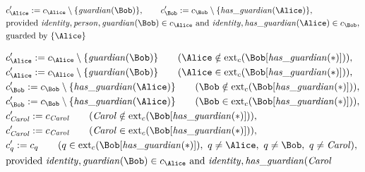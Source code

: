 \begin{align*}
&
c'_
{
\Alice
}
 := 
c_
{
\Alice
}
 \setminus 
\{
\mathit{\detokenize{
guardian
}}
(
\Bob
)
\}
, \qquad 
c'_
{
\Bob
}
 := 
c_
{
\Bob
}
 \setminus 
\{
\mathit{\detokenize{
has_guardian
}}
(
\Alice
)
\}
,\\
&
\text{provided } 
\mathit{\detokenize{
identity
}}
,
\mathit{\detokenize{
person
}}
,
\mathit{\detokenize{
guardian
}}
(
\Bob
)
 \in c_
{
\Alice
}
 \text{ and } 
\mathit{\detokenize{
identity
}}
,
\mathit{\detokenize{
has_guardian
}}
(
\Alice
)
 \in c_
{
\Bob
}
,\\
&
\text{guarded by } \{
\Alice
\}
\end{align*}

\begin{align*}
&
c'_
{
\Alice
}
 := 
c_
{
\Alice
}
 \setminus 
\{
\mathit{\detokenize{
guardian
}}
(
\Bob
)
\}
 \qquad (
\Alice
 \notin 
\mathrm{ext}_c(
\Bob
[
\mathit{\detokenize{
has_guardian
}}
(
\ast
)
]
)
)
,\\
&
c'_
{
\Alice
}
 := 
c_
{
\Alice
}
 \setminus 
\{
\mathit{\detokenize{
guardian
}}
(
\Bob
)
\}
 \qquad (
\Alice
 \in 
\mathrm{ext}_c(
\Bob
[
\mathit{\detokenize{
has_guardian
}}
(
\ast
)
]
)
)
,\\
&
c'_
{
\Bob
}
 := 
c_
{
\Bob
}
 \setminus 
\{
\mathit{\detokenize{
has_guardian
}}
(
\Alice
)
\}
 \qquad (
\Bob
 \notin 
\mathrm{ext}_c(
\Bob
[
\mathit{\detokenize{
has_guardian
}}
(
\ast
)
]
)
)
,\\
&
c'_
{
\Bob
}
 := 
c_
{
\Bob
}
 \setminus 
\{
\mathit{\detokenize{
has_guardian
}}
(
\Alice
)
\}
 \qquad (
\Bob
 \in 
\mathrm{ext}_c(
\Bob
[
\mathit{\detokenize{
has_guardian
}}
(
\ast
)
]
)
)
,\\
&
c'_
{
\mathit{Carol}
}
 := 
c_
{
\mathit{Carol}
}
 \qquad (
\mathit{Carol}
 \notin 
\mathrm{ext}_c(
\Bob
[
\mathit{\detokenize{
has_guardian
}}
(
\ast
)
]
)
)
,\\
&
c'_
{
\mathit{Carol}
}
 := 
c_
{
\mathit{Carol}
}
 \qquad (
\mathit{Carol}
 \in 
\mathrm{ext}_c(
\Bob
[
\mathit{\detokenize{
has_guardian
}}
(
\ast
)
]
)
)
,\\
&
c'_
q
 := 
c_
q
 \qquad (
q
 \in 
\mathrm{ext}_c(
\Bob
[
\mathit{\detokenize{
has_guardian
}}
(
\ast
)
]
)
,\ 
q \neq 
\Alice
,\ 
q \neq 
\Bob
,\ 
q \neq 
\mathit{Carol}
)
,\\
&
\text{provided } 
\mathit{\detokenize{
identity
}}
,
\mathit{\detokenize{
guardian
}}
(
\Bob
)
 \in c_
{
\Alice
}
 \text{ and } 
\mathit{\detokenize{
identity
}}
,
\mathit{\detokenize{
has_guardian
}}
(
\mathit{Carol}

\end{align*}
